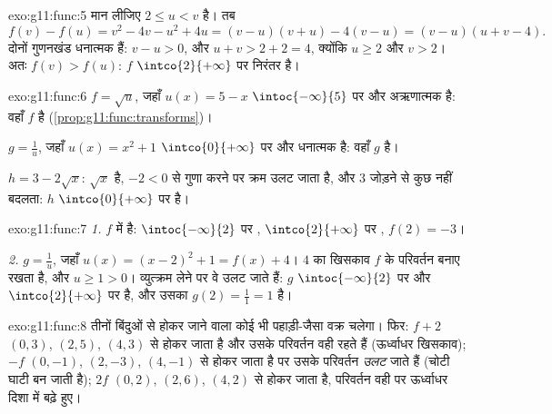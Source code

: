 \begin{solution}{exo:g11:func:5}
मान लीजिए $2 \leq u < v$ है। तब
\[
f(v) - f(u) = v^2 - 4v - u^2 + 4u = (v-u)(v+u) - 4(v-u)
= (v - u)(u + v - 4).
\]
दोनों गुणनखंड धनात्मक हैं: $v - u > 0$, और $u + v > 2 + 2 = 4$, क्योंकि $u \geq 2$ और $v > 2$। अतः $f(v) > f(u)$:
$f$ $\intco{2}{+\infty}$ पर निरंतर  है।
\end{solution}

\begin{solution}{exo:g11:func:6}
$f = \sqrt{u}$, जहाँ $u(x) = 5 - x$ $\intoc{-\infty}{5}$ पर  और अऋणात्मक है: वहाँ $f$  है
(\cref{prop:g11:func:transforms})।

$g = \frac1u$, जहाँ $u(x) = x^2 + 1$ $\intco{0}{+\infty}$ पर  और धनात्मक है: वहाँ $g$  है।

$h = 3 - 2\sqrt x$: $\sqrt x$  है, $-2 < 0$ से गुणा करने पर क्रम उलट जाता है, और $3$ जोड़ने
से कुछ नहीं बदलता: $h$ $\intco{0}{+\infty}$ पर  है।
\end{solution}

\begin{solution}{exo:g11:func:7}
\emph{1.} $f$  में है: $\intoc{-\infty}{2}$ पर , $\intco{2}{+\infty}$ पर , 
$f(2) = -3$।

\emph{2.} $g = \frac{1}{u}$, जहाँ $u(x) = (x-2)^2 + 1 = f(x) + 4$। $4$ का खिसकाव $f$ के परिवर्तन बनाए रखता है, और
$u \geq 1 > 0$। व्युत्क्रम लेने पर वे उलट जाते हैं: $g$ $\intoc{-\infty}{2}$ पर  और $\intco{2}{+\infty}$ पर
 है, और उसका  $g(2) = \frac{1}{1} = 1$ है।
\end{solution}

\begin{solution}{exo:g11:func:8}
तीनों बिंदुओं से होकर जाने वाला कोई भी पहाड़ी-जैसा वक्र चलेगा। फिर: $f + 2$
$(0,3)$, $(2,5)$, $(4,3)$ से होकर जाता है और उसके परिवर्तन वही रहते हैं (ऊर्ध्वाधर
खिसकाव); $-f$ $(0,-1)$, $(2,-3)$, $(4,-1)$ से होकर जाता है पर उसके परिवर्तन \emph{उलट}
जाते हैं (चोटी घाटी बन जाती है); $2f$ $(0,2)$, $(2,6)$, $(4,2)$ से होकर जाता है,
परिवर्तन वही पर ऊर्ध्वाधर दिशा में बढ़े हुए।
\end{solution}

